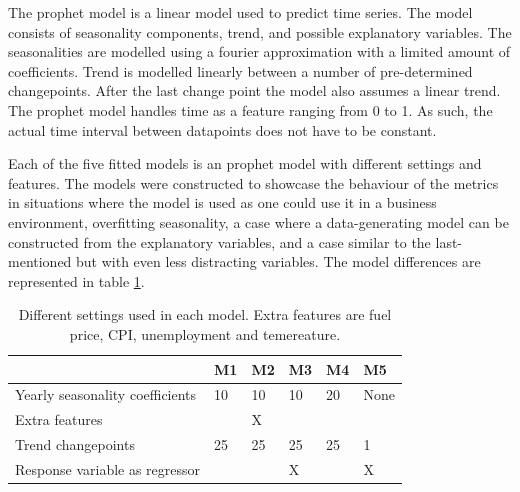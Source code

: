 \documentclass[english, 12pt, a4paper, sci, utf8, a-1b, online]{aaltothesis}
\begin{document}

The prophet model is a linear model used to predict time series. The model consists of seasonality components, trend, and possible explanatory variables. The 
seasonalities are modelled using a fourier approximation with a limited amount of coefficients. Trend is modelled linearly between a number of pre-determined 
changepoints. After the last change point the model also assumes a linear trend. The prophet model handles time as a feature ranging from 0 to 1. As such, 
the actual time interval between datapoints does not have to be constant.

Each of the five fitted models is an prophet model with different settings and features. The models were constructed to showcase the behaviour of the metrics
in situations where the model is used as one could use it in a business environment, overfitting seasonality, a case where a data-generating model can be constructed
from the explanatory variables, and a case similar to the last-mentioned but with even less distracting variables. The model differences are represented in table \ref{tab:model_settings}. 


\begin{table}[]
	\caption{\label{tab:model_settings} Different settings used in each model. Extra features are fuel price, CPI, unemployment and temereature.}
	\begin{tabular}{|l|l|l|l|l|l|}
		\hline
																		& \textbf{M1} & \textbf{M2} & \textbf{M3} & \textbf{M4} & \textbf{M5} \\ \hline
		Yearly seasonality coefficients & 10          & 10          & 10          & 20          & None        \\ \hline
		Extra features                  &             & X           &             &             &             \\ \hline
		Trend changepoints              & 25          & 25          & 25          & 25          & 1           \\ \hline
		Response variable as regressor  &             &             & X           &             & X           \\ \hline
		\end{tabular}
\end{table}
\end{document}

